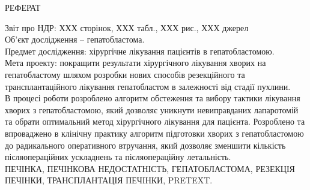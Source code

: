 \thispagestyle{empty}
\begin{center}
    \MakeUppercase{РЕФЕРАТ}
\end{center}



\noindent Звіт про НДР: ХХХ сторінок, ХХХ табл., ХХХ рис., ХХХ джерел \\

\noindent Об'єкт дослідження – гепатобластома.\\

\noindent Предмет дослідження:  хірургічне лікування пацієнтів в гепатобластомою.\\

\noindent Мета проекту:  покращити результати хірургічного лікування хворих на гепатобластому шляхом розробки нових способів резекційного та трансплантаційного лікування гепатобластом в залежності від стадії пухлини. \\

В процесі роботи розроблено алгоритм обстеження та вибору тактики лікування хворих з гепатобластомою, який дозволяє уникнути невиправданих лапаротомій та обрати оптимальний метод хірургічного лікування для пацієнта. Розроблено та впроваджено в клінічну практику алгоритм підготовки хворих з гепатобластомою до радикального оперативного втручання, який дозволяє зменшити кількість післяопераційних ускладнень та післяопераційну летальність. \\

\noindent ПЕЧІНКА, ПЕЧІНКОВА НЕДОСТАТНІСТЬ, ГЕПАТОБЛАСТОМА, РЕЗЕКЦІЯ ПЕЧІНКИ, ТРАНСПЛАНТАЦІЯ ПЕЧІНКИ, PRETEXT.
